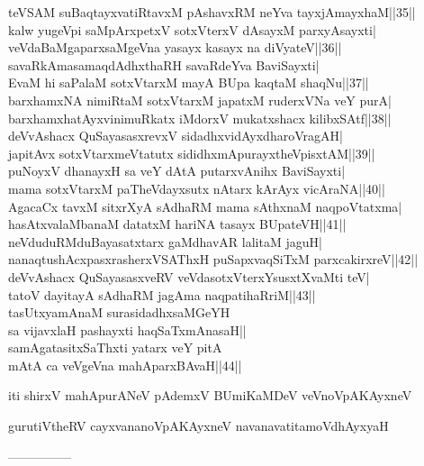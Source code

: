 \documentclass{article}
\begin{document}
teVSAM suBaqtayxvatiRtavxM pAshavxRM neYva tayxjAmayxhaM||35||\\
kalw yugeVpi saMpArxpetxV sotxVterxV dAsayxM parxyAsayxti|\\
veVdaBaMgaparxsaMgeVna yasayx kasayx na diVyateV||36||\\
savaRkAmasamaqdAdhxthaRH savaRdeYva BaviSayxti|\\
EvaM hi saPalaM sotxVtarxM mayA BUpa kaqtaM shaqNu||37||\\
barxhamxNA nimiRtaM sotxVtarxM japatxM ruderxVNa veY purA|\\
barxhamxhatAyxvinimuRkatx iMdorxV mukatxshacx kilibxSAtf||38||\\
deVvAshacx QuSayasasxrevxV sidadhxvidAyxdharoVragAH|\\
japitAvx sotxVtarxmeVtatutx sididhxmApurayxtheVpisxtAM||39||\\
puNoyxV dhanayxH sa veY dAtA putarxvAnihx BaviSayxti|\\
mama sotxVtarxM paTheVdayxsutx nAtarx kArAyx vicAraNA||40||\\
AgacaCx tavxM sitxrXyA sAdhaRM mama sAthxnaM naqpoVtatxma|\\
hasAtxvalaMbanaM datatxM hariNA tasayx BUpateVH||41||\\
neVduduRMduBayasatxtarx gaMdhavAR lalitaM jaguH|\\
nanaqtushAcxpasxrasherxVSAThxH puSapxvaqSiTxM parxcakirxreV||42||\\
deVvAshacx QuSayasasxveRV veVdasotxVterxYsusxtXvaMti teV|\\
tatoV dayitayA sAdhaRM jagAma naqpatihaRriM||43||\\
tasUtxyamAnaM surasidadhxsaMGeYH\\
sa vijavxlaH pashayxti haqSaTxmAnasaH||\\
samAgatasitxSaThxti yatarx veY pitA\\
mAtA ca veVgeVna mahAparxBAvaH||44||\\

\begin{center}
iti shirxV mahApurANeV pAdemxV BUmiKaMDeV veVnoVpAKAyxneV
\end{center}

\begin{center}
gurutiVtheRV cayxvananoVpAKAyxneV navanavatitamoVdhAyxyaH
\end{center}

\begin{center}
---------------
\end{center}
\end{document}
